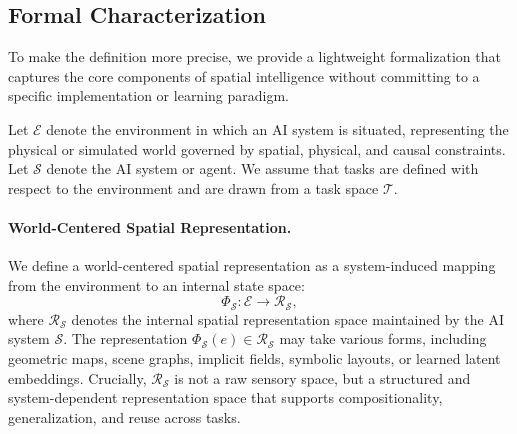 \subsection{Formal Characterization}
\label{subsec:spatial-intelligence-formalization}

To make the definition more precise, we provide a lightweight formalization that captures the core components of spatial intelligence without committing to a specific implementation or learning paradigm.

Let $\mathcal{E}$ denote the environment in which an AI system is situated, representing the physical or simulated world governed by spatial, physical, and causal constraints.
Let $\mathcal{S}$ denote the AI system or agent.
We assume that tasks are defined with respect to the environment and are drawn from a task space $\mathcal{T}$.




\paragraph{World-Centered Spatial Representation.}
We define a world-centered spatial representation as a system-induced mapping from the environment to an internal state space:
\begin{equation}
\Phi_{\mathcal{S}} : \mathcal{E} \rightarrow \mathcal{R}_{\mathcal{S}},
\end{equation}
where $\mathcal{R}_{\mathcal{S}}$ denotes the internal spatial representation space maintained by the AI system $\mathcal{S}$.
The representation $\Phi_{\mathcal{S}}(e) \in \mathcal{R}_{\mathcal{S}}$ may take various forms, including geometric maps, scene graphs, implicit fields, symbolic layouts, or learned latent embeddings.
Crucially, $\mathcal{R}_{\mathcal{S}}$ is not a raw sensory space, but a structured and system-dependent representation space that supports compositionality, generalization, and reuse across tasks.






